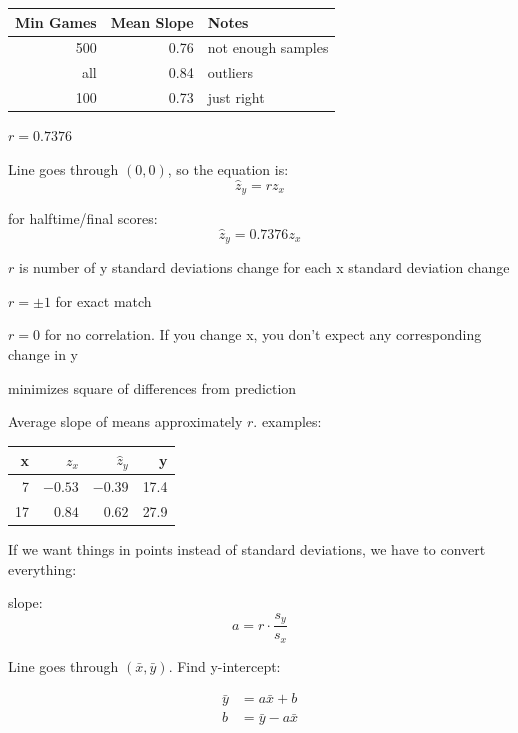 \documentclass[landscape]{exam}
\begin{document}
  \begin{tabular}[H]{rrl}
    \toprule
    Min Games & Mean Slope & Notes \\
    \midrule
    500       & 0.76       & not enough samples\\
    all       & 0.84       & outliers \\
    100       & 0.73       & just right \\
    \bottomrule
  \end{tabular}

  $r = 0.7376$

  Line goes through $(0, 0)$, so the equation is:
  \[
    \hat{z}_y = r z_x
  \]

  for halftime/final scores:
  \[
    \hat{z}_y = 0.7376 z_x
  \]

  \begin{itemize*}
    \item $r$ is number of y standard deviations change for each x standard
      deviation change 

    \item $r = \pm 1$ for exact match

    \item $r = 0$ for no correlation.  If you change x, you don't expect any
      corresponding change in y

    \item minimizes square of differences from prediction
  \end{itemize*}

  Average slope of means approximately $r$.
  examples:

  \begin{tabular}[H]{rrrr}
    \toprule
    x  & $z_x$   & $\hat{z}_y$ & y \\
    \midrule
    7  & $-0.53$ & $-0.39$     & 17.4 \\
    17 & $0.84$  & $0.62$      & 27.9 \\
    \bottomrule
  \end{tabular}

  If we want things in points instead of standard deviations, we have to convert
  everything:

  slope:
  \[
    a = r \cdot \frac{s_y}{s_x}
  \]

  Line goes through $(\bar{x}, \bar{y})$.  Find y-intercept:

  \begin{align*}
    \bar{y} & = a \bar{x} + b \\
    b         & = \bar{y} - a \bar{x} \\
  \end{align*}
\end{document}
